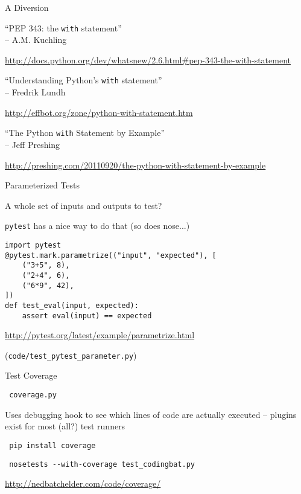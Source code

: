 \documentclass{beamer}
\begin{document}
\begin{frame}[fragile]{A Diversion }

{\Large ``PEP 343: the \verb|with| statement''} \\
\hspace{0.2in}  -- A.M. Kuchling

\url{http://docs.python.org/dev/whatsnew/2.6.html#pep-343-the-with-statement}

\vfill
{\Large ``Understanding Python's \verb|with| statement''} \\
\hspace{0.2in}  -- Fredrik Lundh 

\url{http://effbot.org/zone/python-with-statement.htm}

\vfill
{\Large ``The Python \verb|with| Statement by Example''} \\
\hspace{0.2in}  -- Jeff Preshing 

\url{http://preshing.com/20110920/the-python-with-statement-by-example}

\end{frame} 

\begin{frame}[fragile]{Parameterized Tests}

{\Large A whole set of inputs and outputs to test?}

\vfill
{\Large \verb|pytest| has a nice way to do that (so does nose...)}

\begin{verbatim}
import pytest
@pytest.mark.parametrize(("input", "expected"), [
    ("3+5", 8),
    ("2+4", 6),
    ("6*9", 42),
])
def test_eval(input, expected):
    assert eval(input) == expected
\end{verbatim}

\url{http://pytest.org/latest/example/parametrize.html}

\vfill
(\verb|code/test_pytest_parameter.py|)
\end{frame} 

\begin{frame}[fragile]{Test Coverage}

{\LARGE \verb|￼coverage.py |}

\vfill
{\Large Uses debugging hook to see which lines of code are actually executed
-- plugins exist for most (all?) test runners}

\vfill
{\Large \verb|￼pip install coverage |}

\vfill
{\Large \verb|￼nosetests --with-coverage test_codingbat.py|}

\vfill
\url{http://nedbatchelder.com/code/coverage/}
\end{frame}
\end{document}
